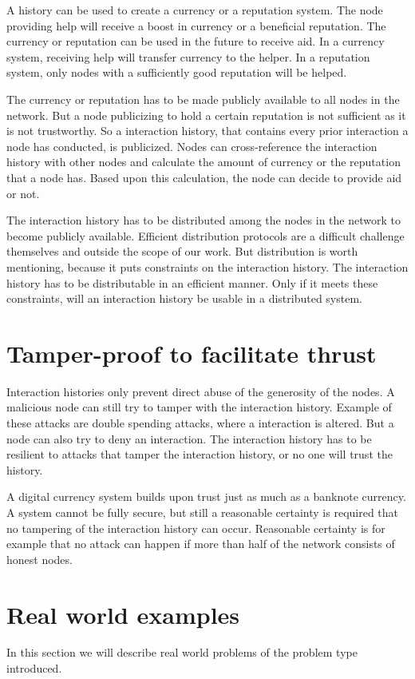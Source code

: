 A history can be used to create a currency or a reputation system.
The node providing help will receive a boost in currency or a beneficial reputation.
The currency or reputation can be used in the future to receive aid.
In a currency system, receiving help will transfer currency to the helper.
In a reputation system, only nodes with a sufficiently good reputation will be helped.

The currency or reputation has to be made publicly available to all nodes in the network.
But a node publicizing to hold a certain reputation is not sufficient as it is not trustworthy.
So a interaction history, that contains every prior interaction a node has conducted, is publicized.
Nodes can cross-reference the interaction history with other nodes and calculate the amount of currency 
or the reputation that a node has.
Based upon this calculation, the node can decide to provide aid or not.

The interaction history has to be distributed among the nodes in the network
to become publicly available.
Efficient distribution protocols are a difficult challenge themselves and outside the scope of our work.
But distribution is worth mentioning, because it puts constraints on the interaction history.
The interaction history has to be distributable in an efficient manner.
Only if it meets these constraints, will an interaction history be usable in a distributed system.

\section{Tamper-proof to facilitate thrust}

Interaction histories only prevent direct abuse of the generosity of the nodes.
A malicious node can still try to tamper with the interaction history.
Example of these attacks are double spending attacks\cite{Nakamoto-bitcoin},
where a interaction is altered.
But a node can also try to deny an interaction.
The interaction history has to be resilient to attacks that tamper the interaction history, 
or no one will trust the history.

A digital currency system builds upon trust just as much as a banknote currency.
A system cannot be fully secure, 
but still a reasonable certainty is required that no tampering of the interaction history can occur.
Reasonable certainty is for example that no attack can happen 
if more than half of the network consists of honest nodes.

\section{Real world examples}
In this section we will describe real world problems of the problem type introduced.

